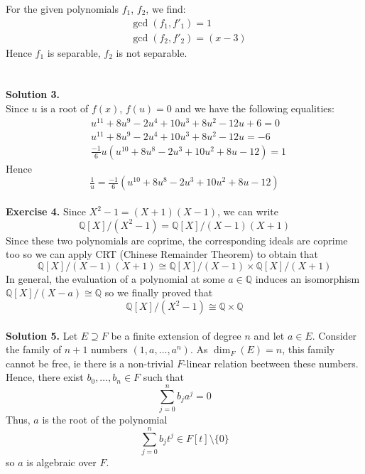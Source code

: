 \documentclass[12pt,a4paper]{article}
\begin{document}
For the given polynomials $f_1$, $f_2$, we find: 
\begin{align*}
&\gcd(f_1, f'_1)=1\\
&\gcd(f_2, f'_2)=(x-3)
\end{align*}
Hence $f_1$ is separable, $f_2$ is not separable. 
\\
\\
\\
\textbf{Solution 3.  }\\
Since  $u$ is a root of $f(x)$, $f(u)=0$ and we have the following equalities: 
\begin{align*}
& u^{11}+8u^9-2u^4+10u^3+8u^2-12u+6=0 \\
& u^{11}+8u^9-2u^4+10u^3+8u^2-12u = -6 \\
& \tfrac{-1}{6}u(u^{10}+8u^8-2u^3+10u^2+8u-12)=1
\end{align*}
Hence 
$$\tfrac{1}{u}= \tfrac{-1}{6}(u^{10}+8u^8-2u^3+10u^2+8u-12)$$
\\
\textbf{Exercise 4.}
	Since $X^2 - 1 = (X + 1)(X - 1)$, we can write \[ \mathbb{Q}[X]/(X^2 - 1) = \mathbb{Q}[X]/(X - 1)(X + 1) \]
	Since these two polynomials are coprime, the corresponding ideals are coprime too so we can apply CRT (Chinese Remainder Theorem) to obtain that \[ \mathbb{Q}[X]/(X - 1)(X + 1) \cong \mathbb{Q}[X]/(X - 1) \times \mathbb{Q}[X]/(X + 1) \] 
	In general, the evaluation of a polynomial at some $a \in \mathbb{Q}$ induces an isomorphism $\mathbb{Q}[X]/(X - a) \cong \mathbb{Q}$ so we finally proved that \[ \mathbb{Q}[X]/(X^2 - 1) \cong \mathbb{Q} \times \mathbb{Q}\] 
	\\
	\textbf{Solution 5.}
	Let $E \supseteq F$ be a finite extension of degree $n$ and let $a \in E$. Consider the family of $n + 1$ numbers $(1, a, \dots, a^n)$. As $\dim_F(E) = n$, this family cannot be free, ie there is a non-trivial $F$-linear relation beetween these numbers. Hence, there exist $b_0, \dots, b_n \in F$ such that \[ \sum_{j = 0}^{n}b_ja^j = 0 \] Thus, $a$ is the root of the polynomial \[ \sum_{j = 0}^{n}b_jt^j \in F[t] \setminus \{0\} \] so $a$ is algebraic over $F$. \\
	
\end{document}
